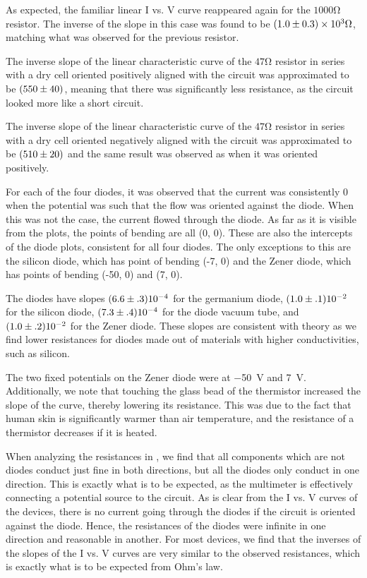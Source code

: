 \begin{paper}
	As expected, the familiar linear I vs. V curve reappeared again for the \( 1000 \si{\ohm} \) resistor. The inverse of the slope in this case was found to be \( \left(1.0 \pm 0.3\right) \times 10^3 \si{\ohm} \), matching what was observed for the previous resistor.
	
	The inverse slope of the linear characteristic curve of the \( 47 \si{\ohm} \) resistor in series with a dry cell oriented positively aligned with the circuit was approximated to be \( \left(550 \pm 40 \right) \), meaning that there was significantly less resistance, as the circuit looked more like a short circuit.
	
	The inverse slope of the linear characteristic curve of the \( 47 \si{\ohm} \) resistor in series with a dry cell oriented negatively aligned with the circuit was approximated to be \( \left(510 \pm 20 \right) \) and the same result was observed as when it was oriented positively.
	
	For each of the four diodes, it was observed that the current was consistently 0 when the potential was such that the flow was oriented against the diode. When this was not the case, the current flowed through the diode. As far as it is visible from the plots, the points of bending are all (0, 0). These are also the intercepts of the diode plots, consistent for all four diodes. The only exceptions to this are the silicon diode, which has point of bending (-7, 0) and the Zener diode, which has points of bending (-50, 0) and (7, 0).
	
	The diodes have slopes $(6.6\pm.3)\SI{E-4}{}$ for the germanium diode, $(1.0\pm.1)\SI{E-2}{}$ for the silicon diode, $(7.3\pm.4)\SI{E-4}{}$ for the diode vacuum tube, and $(1.0\pm.2)\SI{E-2}{}$ for the Zener diode. These slopes are consistent with theory as we find lower resistances for diodes made out of materials with higher conductivities, such as silicon.
	
	The two fixed potentials on the Zener diode were at \SI{-50}{\volt} and \SI{7}{\volt}. Additionally, we note that touching the glass bead of the thermistor increased the slope of the curve, thereby lowering its resistance. This was due to the fact that human skin is significantly warmer than air temperature, and the resistance of a thermistor decreases if it is heated.
	
	When analyzing the resistances in \figResistances, we find that all components which are not diodes conduct just fine in both directions, but all the diodes only conduct in one direction. This is exactly what is to be expected, as the multimeter is effectively connecting a potential source to the circuit. As is clear from the I vs. V curves of the devices, there is no current going through the diodes if the circuit is oriented against the diode. Hence, the resistances of the diodes were infinite in one direction and reasonable in another. For most devices, we find that the inverses of the slopes of the I vs. V curves are very similar to the observed resistances, which is exactly what is to be expected from Ohm's law.
	

\end{paper}
